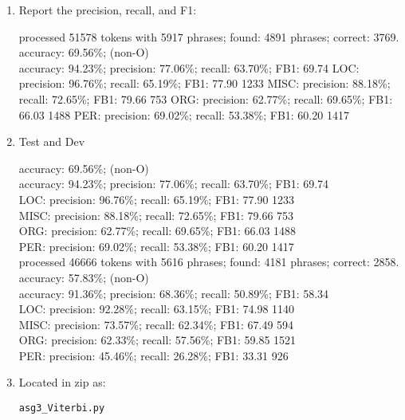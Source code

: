 \documentclass[11pt,letterpaper]{article}
\begin{document}
\begin{enumerate}
    \item Report the precision, recall, and F1:
    \begin{center}
    processed 51578 tokens with 5917 phrases; found: 4891 phrases; correct: 3769.\\
accuracy:  69.56\%; (non-O)\\
accuracy:  94.23\%; precision:  77.06\%; recall:  63.70\%; FB1:  69.74
              LOC: precision:  96.76\%; recall:  65.19\%; FB1:  77.90  1233
             MISC: precision:  88.18\%; recall:  72.65\%; FB1:  79.66  753
              ORG: precision:  62.77\%; recall:  69.65\%; FB1:  66.03  1488
              PER: precision:  69.02\%; recall:  53.38\%; FB1:  60.20  1417    
    \end{center}
    \item Test and Dev
    \begin{center}
        accuracy:  69.56\%; (non-O)\\
accuracy:  94.23\%; precision:  77.06\%; recall:  63.70\%; FB1:  69.74\\
              LOC: precision:  96.76\%; recall:  65.19\%; FB1:  77.90  1233\\
             MISC: precision:  88.18\%; recall:  72.65\%; FB1:  79.66  753\\
              ORG: precision:  62.77\%; recall:  69.65\%; FB1:  66.03  1488\\
              PER: precision:  69.02\%; recall:  53.38\%; FB1:  60.20  1417\\
processed 46666 tokens with 5616 phrases; found: 4181 phrases; correct: 2858.\\
accuracy:  57.83\%; (non-O)\\
accuracy:  91.36\%; precision:  68.36\%; recall:  50.89\%; FB1:  58.34\\
              LOC: precision:  92.28\%; recall:  63.15\%; FB1:  74.98  1140\\
             MISC: precision:  73.57\%; recall:  62.34\%; FB1:  67.49  594\\
              ORG: precision:  62.33\%; recall:  57.56\%; FB1:  59.85  1521\\
              PER: precision:  45.46\%; recall:  26.28\%; FB1:  33.31  926\\
    \end{center}
    \item Located in zip as: \begin{verbatim}asg3_Viterbi.py\end{verbatim}
\end{enumerate}

\label{lastpage}
\end{document}
